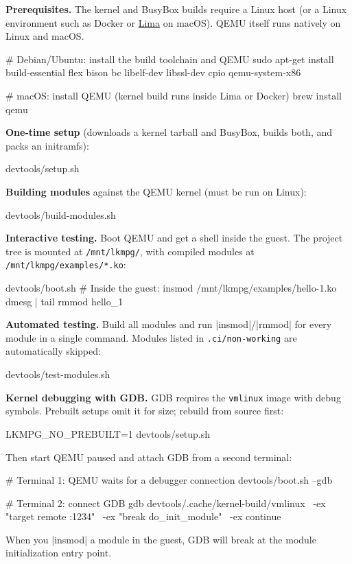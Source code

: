 \documentclass[10pt, oneside]{book}
\begin{document}
\textbf{Prerequisites.}
The kernel and BusyBox builds require a Linux host (or a Linux environment such as
Docker or \href{https://lima-vm.io/}{Lima} on macOS).
QEMU itself runs natively on Linux and macOS.

\begin{codebash}
# Debian/Ubuntu: install the build toolchain and QEMU
sudo apt-get install build-essential flex bison bc libelf-dev libssl-dev cpio qemu-system-x86

# macOS: install QEMU (kernel build runs inside Lima or Docker)
brew install qemu
\end{codebash}

\textbf{One-time setup} (downloads a kernel tarball and BusyBox, builds both, and
packs an initramfs):
\begin{codebash}
devtools/setup.sh
\end{codebash}

\textbf{Building modules} against the QEMU kernel (must be run on Linux):
\begin{codebash}
devtools/build-modules.sh
\end{codebash}

\textbf{Interactive testing.}
Boot QEMU and get a shell inside the guest.
The project tree is mounted at \verb|/mnt/lkmpg/|, with compiled modules at
\verb|/mnt/lkmpg/examples/*.ko|:
\begin{codebash}
devtools/boot.sh
# Inside the guest:
insmod /mnt/lkmpg/examples/hello-1.ko
dmesg | tail
rmmod hello_1
\end{codebash}

\textbf{Automated testing.}
Build all modules and run \sh|insmod|/\sh|rmmod| for every module in a single
command.
Modules listed in \verb|.ci/non-working| are automatically skipped:
\begin{codebash}
devtools/test-modules.sh
\end{codebash}

\textbf{Kernel debugging with GDB.}
GDB requires the \verb|vmlinux| image with debug symbols.
Prebuilt setups omit it for size; rebuild from source first:
\begin{codebash}
LKMPG_NO_PREBUILT=1 devtools/setup.sh
\end{codebash}

Then start QEMU paused and attach GDB from a second terminal:
\begin{codebash}
# Terminal 1: QEMU waits for a debugger connection
devtools/boot.sh --gdb

# Terminal 2: connect GDB
gdb devtools/.cache/kernel-build/vmlinux \
    -ex "target remote :1234" \
    -ex "break do_init_module" \
    -ex continue
\end{codebash}
When you \sh|insmod| a module in the guest, GDB will break at the module
initialization entry point.
\end{document}
